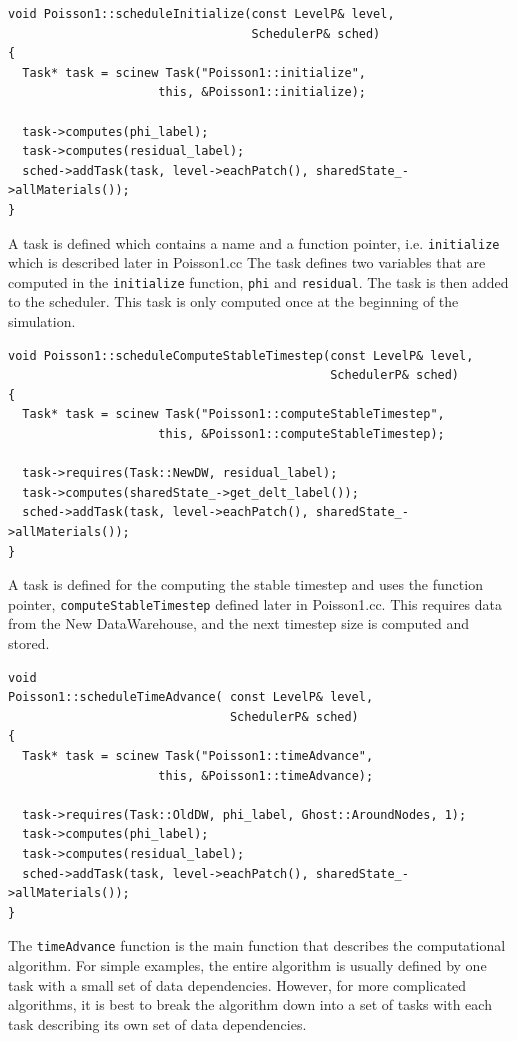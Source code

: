 \documentclass[12pt]{report}
\begin{document}
\begin{Verbatim}[fontsize=\footnotesize]
void Poisson1::scheduleInitialize(const LevelP& level,
                                  SchedulerP& sched)
{
  Task* task = scinew Task("Poisson1::initialize",
                     this, &Poisson1::initialize);

  task->computes(phi_label);
  task->computes(residual_label);
  sched->addTask(task, level->eachPatch(), sharedState_->allMaterials());
}
\end{Verbatim}

A task is defined which contains a name and a function pointer,
i.e. \texttt{initialize} which is described later in Poisson1.cc The
task defines two variables that are computed in the
\texttt{initialize} function, \texttt{phi} and \texttt{residual}.  The
task is then added to the scheduler.  This task is only computed once
at the beginning of the simulation.

\begin{Verbatim}[fontsize=\footnotesize]
void Poisson1::scheduleComputeStableTimestep(const LevelP& level,
                                             SchedulerP& sched)
{
  Task* task = scinew Task("Poisson1::computeStableTimestep",
                     this, &Poisson1::computeStableTimestep);

  task->requires(Task::NewDW, residual_label);
  task->computes(sharedState_->get_delt_label());
  sched->addTask(task, level->eachPatch(), sharedState_->allMaterials());
}

\end{Verbatim}

A task is defined for the computing the stable timestep and uses the
function pointer, \texttt{computeStableTimestep} defined later in
Poisson1.cc.  This requires data from the New DataWarehouse, and the
next timestep size is computed and stored.

\begin{Verbatim}[fontsize=\footnotesize]
void
Poisson1::scheduleTimeAdvance( const LevelP& level,
                               SchedulerP& sched)
{
  Task* task = scinew Task("Poisson1::timeAdvance",
                     this, &Poisson1::timeAdvance);

  task->requires(Task::OldDW, phi_label, Ghost::AroundNodes, 1);
  task->computes(phi_label);
  task->computes(residual_label);
  sched->addTask(task, level->eachPatch(), sharedState_->allMaterials());
}
\end{Verbatim}

The \texttt{timeAdvance} function is the main function that describes
the computational algorithm.  For simple examples, the entire
algorithm is usually defined by one task with a small set of data
dependencies.  However, for more complicated algorithms, it is best to
break the algorithm down into a set of tasks with each task describing
its own set of data dependencies.
\end{document}
